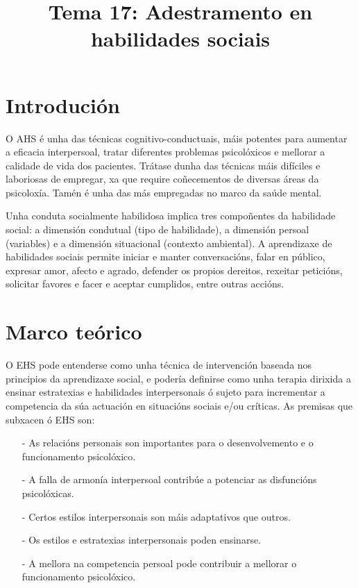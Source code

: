 \documentclass[a4paper,11pt]{article}
\title{Tema 17: Adestramento en habilidades sociais}
\date{}
\begin{document}
   

\maketitle 

\section{Introdución}
O AHS é unha das técnicas cognitivo-conductuais, máis potentes para aumentar a eficacia interpersoal, tratar diferentes problemas psicolóxicos e mellorar a calidade de vida dos pacientes. Trátase dunha das técnicas máis difíciles e laboriosas de empregar, xa que require coñecementos de diversas áreas da psicoloxía. Tamén é unha das más empregadas no marco da saúde mental.

Unha conduta socialmente habilidosa implica tres compoñentes da habilidade social: a dimensión condutual (tipo de habilidade), a dimensión persoal (variables) e a dimensión situacional (contexto ambiental). A aprendizaxe de habilidades sociais permite iniciar e manter conversacións, falar en público, expresar amor, afecto e agrado, defender os propios dereitos, rexeitar peticións, solicitar favores e facer e aceptar cumplidos, entre outras accións. 

\section{Marco teórico}
O EHS pode entenderse como unha técnica de intervención baseada nos principios da aprendizaxe social, e podería definirse como unha terapia dirixida a ensinar estratexias e habilidades interpersonais ó sujeto para incrementar a competencia da súa actuación en situacións sociais e/ou críticas. As premisas que subxacen ó EHS son:
\begin{itemize}
	\item[-] As relacións personais son importantes para o desenvolvemento e o funcionamento 
	psicolóxico.
	\item[-] A falla de armonía interpersoal contribúe a potenciar as disfuncións psicolóxicas.
	\item[-] Certos estilos interpersonais son máis adaptativos que outros. 
	\item[-] Os estilos e estratexias interpersonais poden ensinarse.
	\item[-] A mellora na competencia persoal pode contribuir a mellorar o funcionamento psicolóxico.
\end{itemize}
\end{document}
